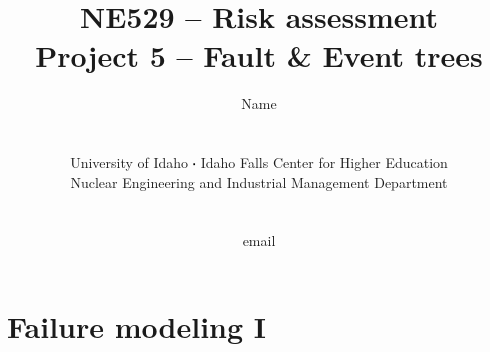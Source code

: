 \documentclass[11pt,a4paper]{article}
\newcommand*\sq{\mathbin{\vcenter{\hbox{\rule{.3ex}{.3ex}}}}} %
\begin{document}
\begin{titlepage}
    \title{
        NE529 -- Risk assessment\\
        Project 5 -- Fault \& Event trees\\
    }
    \author{
        Name
        \\ \\ \\
        University of Idaho $\sq$ Idaho Falls Center for Higher Education\\
        Nuclear Engineering and Industrial Management Department
        \\ \\ \\
        email 
    }
\clearpage %
\maketitle
\vspace*{\fill}
\thispagestyle{empty} %
\end{titlepage}


\section{Failure modeling I}
\end{document}
